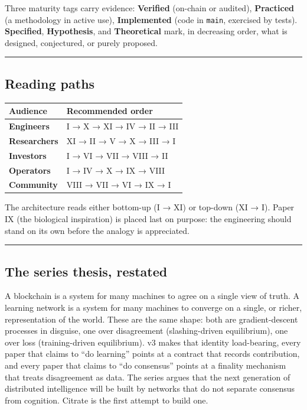 Three maturity tags carry evidence: \textbf{Verified} (on-chain or
audited), \textbf{Practiced} (a methodology in active use),
\textbf{Implemented} (code in \texttt{main}, exercised by tests).
\textbf{Specified}, \textbf{Hypothesis}, and \textbf{Theoretical} mark,
in decreasing order, what is designed, conjectured, or purely proposed.

\begin{center}\rule{0.5\linewidth}{0.5pt}\end{center}

\subsection{Reading paths}\label{reading-paths}

{\def\LTcaptype{none} %
\begin{longtable}[]{@{}ll@{}}
\toprule\noalign{}
Audience & Recommended order \\
\midrule\noalign{}
\endhead
\bottomrule\noalign{}
\endlastfoot
\textbf{Engineers} & I → X → XI → IV → II → III \\
\textbf{Researchers} & XI → II → V → X → III → I \\
\textbf{Investors} & I → VI → VII → VIII → II \\
\textbf{Operators} & I → IV → X → IX → VIII \\
\textbf{Community} & VIII → VII → VI → IX → I \\
\end{longtable}
}

The architecture reads either bottom-up (I → XI) or top-down (XI → I).
Paper IX (the biological inspiration) is placed last on purpose: the
engineering should stand on its own before the analogy is appreciated.

\begin{center}\rule{0.5\linewidth}{0.5pt}\end{center}

\subsection{The series thesis,
restated}\label{the-series-thesis-restated}

A blockchain is a system for many machines to agree on a single view of
truth. A learning network is a system for many machines to converge on a
single, or richer, representation of the world. These are the same
shape: both are gradient-descent processes in disguise, one over
disagreement (slashing-driven equilibrium), one over loss
(training-driven equilibrium). v3 makes that identity load-bearing,
every paper that claims to ``do learning'' points at a contract that
records contribution, and every paper that claims to ``do consensus''
points at a finality mechanism that treats disagreement as data. The
series argues that the next generation of distributed intelligence will
be built by networks that do not separate consensus from cognition.
Citrate is the first attempt to build one.

